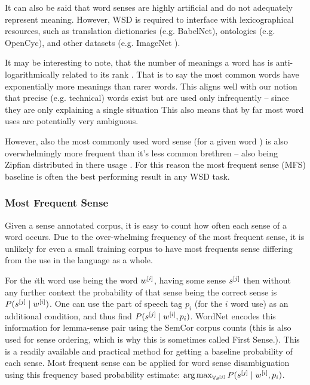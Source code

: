 \documentclass[12pt,parskip]{komatufte}
\begin{document}
It can also be said that word senses are highly artificial and do not adequately represent meaning.
However, WSD is required to interface with  lexicographical resources,
such as translation dictionaries (e.g. BabelNet), ontologies (e.g. OpenCyc), and other datasets (e.g. ImageNet ).


It may be interesting to note, that the number of meanings a word has is anti-logarithmically related to its rank .
That is to say the most common words have exponentially more meanings than rarer words.
This aligns well with our notion that precise (e.g. technical) words exist but are used only infrequently -- since they are only explaining a single situation
This also means that by far most word uses are potentially very ambiguous.

However, also the most commonly used word sense (for a given word ) is also overwhelmingly more frequent than it's less common brethren -- also being Zipfian distributed in there usage \cite{Kilgarriff2004}.
For this reason the most frequent sense (MFS) baseline is often the best performing result in any WSD task.

\subsubsection{Most Frequent Sense}\label{sec:most-frequent-sense}
Given a sense annotated corpus, it is easy to count how often each sense of a word occurs.
Due to the over-whelming frequency of the most frequent sense, it is unlikely for even a small training corpus to have most frequents sense differing from the use in the language as a whole.


For the $i$th word use being the word $\n w_i$, having some sense $\n s_j$
then without any further context the 
probability of that sense being the correct sense is $P(\n s_j \mid \n w_i)$.
One can use the part of speech tag $p_i$ (for the $i$ word use) as an additional condition, and thus find $P(\n s_j \mid \n w_i, p_i)$.
WordNet encodes this information for lemma-sense pair using the SemCor corpus counts (this is also used for sense ordering, which is why this is sometimes called First Sense.).
This is a readily available and practical method for getting a baseline probability of each sense.
Most frequent sense can be applied for word sense disambiguation using this frequency based probability estimate:  $\argmax_{\forall \n s_j} P(\n s_j \mid \n w_i, p_i)$.
\end{document}
